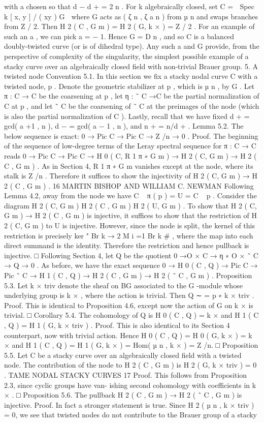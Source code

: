 \documentclass{article}
\begin{document}
with a chosen so that d − d + = 2 n . For k algebraically closed, set C =  Spec k [ x, y ] / ( xy ) G  where G acts as ( ζ n , ζ a n ) from µ n and swaps branches from Z / 2. Then H 2 ( C , G m ) = H 2 ( G, k × ) = Z / 2 . For an example of such an a , we can pick a = − 1. Hence G = D n , and so C is a balanced doubly-twisted curve (or is of dihedral type). Any such a and G provide, from the perspective of complexity of the singularity, the simplest possible example of a stacky curve over an algebraically closed field with non-trivial Brauer group. 5. A twisted node Convention 5.1. In this section we fix a stacky nodal curve C with a twisted node, p . Denote the geometric stabilizer at p , which is µ n , by G . Let π : C → C be the coarsening at p , let η : ˜ C →C be the partial normalization of C at p , and let ˜ C be the coarsening of ˜ C at the preimages of the node (which is also the partial normalization of C ). Lastly, recall that we have fixed d + = gcd( a +1 , n ), d − = gcd( a − 1 , n ), and n + = n/d + . Lemma 5.2. The below sequence is exact: 0 → Pic C → Pic C → Z /n → 0 . Proof. The beginning of the sequence of low-degree terms of the Leray spectral sequence for π : C → C reads 0 → Pic C → Pic C → H 0 ( C, R 1 π ∗ G m ) → H 2 ( C, G m ) → H 2 ( C , G m ) . As in Section 4, R 1 π ∗ G m vanishes except at the node, where its stalk is Z /n . Therefore it suffices to show the injectivity of H 2 ( C, G m ) → H 2 ( C , G m ) . 16 MARTIN BISHOP AND WILLIAM C. NEWMAN Following Lemma 4.2, away from the node we have C \ { π ( p ) } = U = C \ { p } . Consider the diagram H 2 ( C, G m ) H 2 ( C , G m ) H 2 ( U, G m ) . To show that H 2 ( C, G m ) → H 2 ( C , G m ) is injective, it suffices to show that the restriction of H 2 ( C, G m ) to U is injective. However, since the node is split, the kernel of this restriction is precisely ker " Br k → 2 M i =1 Br k # , where the map into each direct summand is the identity. Therefore the restriction and hence pullback is injective. □ Following Section 4, let Q be the quotient 0 →O × C → η ∗ O × ˜ C → Q → 0 . As before, we have the exact sequence 0 → H 0 ( C , Q ) → Pic C → Pic ˜ C → H 1 ( C , Q ) → H 2 ( C , G m ) → H 2 ( ˜ C , G m ) . Proposition 5.3. Let k × triv denote the sheaf on BG associated to the G -module whose underlying group is k × , where the action is trivial. Then Q ∼ = p ∗ k × triv . Proof. This is identical to Proposition 4.6, except now the action of G on k × is trivial. □ Corollary 5.4. The cohomology of Q is H 0 ( C , Q ) = k × and H 1 ( C , Q ) = H 1 ( G, k × triv ) . Proof. This is also identical to its Section 4 counterpart, now with trivial action. Hence H 0 ( C , Q ) = H 0 ( G, k × ) = k × and H 1 ( C , Q ) = H 1 ( G, k × ) = Hom( µ n , k × ) = Z /n. □ Proposition 5.5. Let C be a stacky curve over an algebraically closed field with a twisted node. The contribution of the node to H 2 ( C , G m ) is H 2 ( G, k × triv ) = 0 . TAME NODAL STACKY CURVES 17 Proof. This follows from Proposition 2.3, since cyclic groups have van- ishing second cohomology with coefficients in k × . □ Proposition 5.6. The pullback H 2 ( C , G m ) → H 2 ( ˜ C , G m ) is injective. Proof. In fact a stronger statement is true. Since H 2 ( µ n , k × triv ) = 0, we see that twisted nodes do not contribute to the Brauer group of a stacky 
\end{document}

